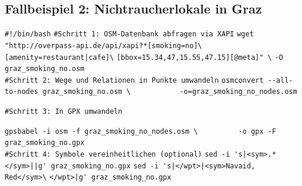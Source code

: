 \documentclass{beamer}
\begin{document}
\subsection{Fallbeispiel 2: Nichtraucherlokale in Graz}
\begin{frame}[fragile]

\verb+#!/bin/bash+
\verb+#Schritt 1: OSM-Datenbank abfragen via XAPI+
\verb+wget "http://overpass-api.de/api/xapi?*[smoking=no]\+
\verb+[amenity=restaurant|cafe]\+
\verb+[bbox=15.34,47,15.55,47.15][@meta]" \+
\verb+-O graz_smoking_no.osm+
\\
\verb+#Schritt 2: Wege und Relationen in Punkte umwandeln+
\verb+osmconvert --all-to-nodes graz_smoking_no.osm \+
\verb+           -o=graz_smoking_no_nodes.osm+
\end{frame}
\begin{frame}[fragile]


\verb+#Schritt 3: In GPX umwandeln +

\verb+gpsbabel -i osm -f graz_smoking_no_nodes.osm \+
\verb+         -o gpx -F graz_smoking_no.gpx+
\\
\verb+#Schritt 4: Symbole vereinheitlichen (optional)+
\verb+sed -i 's|<sym>.*</sym>||g' graz_smoking_no.gpx+
\verb+sed -i 's|</wpt>|<sym>Navaid, Red</sym>\+
\verb+</wpt>|g' graz_smoking_no.gpx+
\end{frame}
\end{document}
